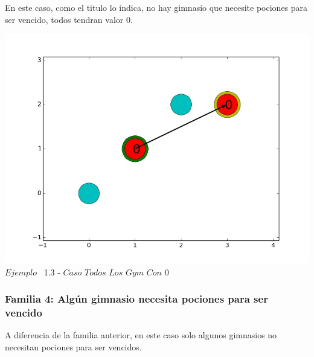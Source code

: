 En este caso, como el titulo lo indica, no hay gimnasio que necesite pociones para ser vencido, todos tendran valor 0.
 
\vspace*{0.3cm} \vspace*{0.3cm}
  \begin{center}
 \includegraphics[scale=0.6]{./EJ1/gym0.jpeg}
\\ {$Ejemplo$ \ 1.3 - $Caso$ $Todos$ $Los$ $Gym$ $Con$ $0$}
  \end{center}
  \vspace*{0.3cm}

\begin{center}
  \subsubsection*{Familia 4: Alg\'un gimnasio necesita pociones para ser vencido}
\end{center}

A diferencia de la familia anterior, en este caso solo algunos gimnasios no necesitan pociones para ser vencidos.\\

